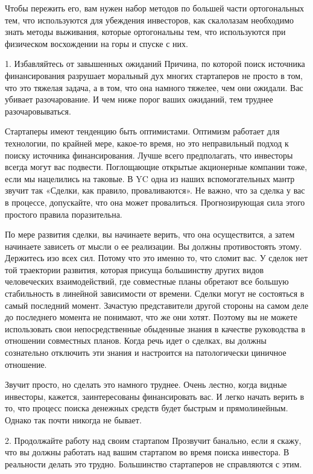\documentclass[ebook,12pt,oneside,openany]{memoir}
\begin{document}
Чтобы пережить его, вам нужен набор методов по большей части
ортогональных тем, что используются для убеждения инвесторов, как
скалолазам необходимо знать методы выживания, которые ортогональны
тем, что используются при физическом восхождении на горы и спуске с
них.

1. Избавляйтесь от завышенных ожиданий Причина, по которой поиск
источника финансирования разрушает моральный дух многих стартаперов не
просто в том, что это тяжелая задача, а в том, что она намного
тяжелее, чем они ожидали. Вас убивает разочарование. И чем ниже порог
ваших ожиданий, тем труднее разочаровываться.

Стартаперы имеют тенденцию быть оптимистами. Оптимизм работает для
технологии, по крайней мере, какое-то время, но это неправильный
подход к поиску источника финансирования. Лучше всего предполагать,
что инвесторы всегда могут вас подвести. Поглощающие открытые
акционерные компании тоже, если мы нацелились на таковые. В YC одна из
наших вспомогательных мантр звучит так «Сделки, как правило,
проваливаются». Не важно, что за сделка у вас в процессе, допускайте,
что она может провалиться. Прогнозирующая сила этого простого правила
поразительна.

По мере развития сделки, вы начинаете верить, что она осуществится, а
затем начинаете зависеть от мысли о ее реализации. Вы должны
противостоять этому. Держитесь изо всех сил. Потому что это именно то,
что сломит вас. У сделок нет той траектории развития, которая присуща
большинству других видов человеческих взаимодействий, где совместные
планы обретают все большую стабильность в линейной зависимости от
времени. Сделки могут не состояться в самый последний момент. Зачастую
представители другой стороны на самом деле до последнего момента не
понимают, что же они хотят. Поэтому вы не можете использовать свои
непосредственные обыденные знания в качестве руководства в отношении
совместных планов. Когда речь идет о сделках, вы должны сознательно
отключить эти знания и настроится на патологически циничное отношение.

Звучит просто, но сделать это намного труднее. Очень лестно, когда
видные инвесторы, кажется, заинтересованы финансировать вас. И легко
начать верить в то, что процесс поиска денежных средств будет быстрым
и прямолинейным. Однако так почти никогда не бывает.

2. Продолжайте работу над своим стартапом Прозвучит банально, если я
скажу, что вы должны работать над вашим стартапом во время поиска
инвестора. В реальности делать это трудно. Большинство стартаперов не
справляются с этим.
\end{document}
